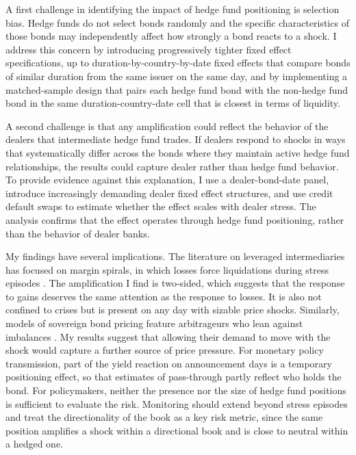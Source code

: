 \documentclass[english, 11pt, oneside]{article}
\begin{document}
A first challenge in identifying the impact of hedge fund positioning is selection bias. Hedge funds do not select bonds randomly and the specific characteristics of those bonds may independently affect how strongly a bond reacts to a shock. I address this concern by introducing progressively tighter fixed effect specifications, up to duration-by-country-by-date fixed effects that compare bonds of similar duration from the same issuer on the same day, and by implementing a matched-sample design that pairs each hedge fund bond with the non-hedge fund bond in the same duration-country-date cell that is closest in terms of liquidity.

A second challenge is that any amplification could reflect the behavior of the dealers that intermediate hedge fund trades. If dealers respond to shocks in ways that systematically differ across the bonds where they maintain active hedge fund relationships, the results could capture dealer rather than hedge fund behavior. To provide evidence against this explanation, I use a dealer-bond-date panel, introduce increasingly demanding dealer fixed effect structures, and use credit default swaps to estimate whether the effect scales with dealer stress. The analysis confirms that the effect operates through hedge fund positioning, rather than the behavior of dealer banks.

My findings have several implications. The literature on leveraged intermediaries has focused on margin spirals, in which losses force liquidations during stress episodes \citep{brunnermeier2009, geanakoplos2010, adrian2010}. The amplification I find is two-sided, which suggests that the response to gains deserves the same attention as the response to losses. It is also not confined to crises but is present on any day with sizable price shocks. Similarly, models of sovereign bond pricing feature arbitrageurs who lean against imbalances \citep{greenwood2014, jansen2024}. My results suggest that allowing their demand to move with the shock would capture a further source of price pressure. For monetary policy transmission, part of the yield reaction on announcement days is a temporary positioning effect, so that estimates of pass-through partly reflect who holds the bond. For policymakers, neither the presence nor the size of hedge fund positions is sufficient to evaluate the risk. Monitoring should extend beyond stress episodes and treat the directionality of the book as a key risk metric, since the same position amplifies a shock within a directional book and is close to neutral within a hedged one.
\end{document}
